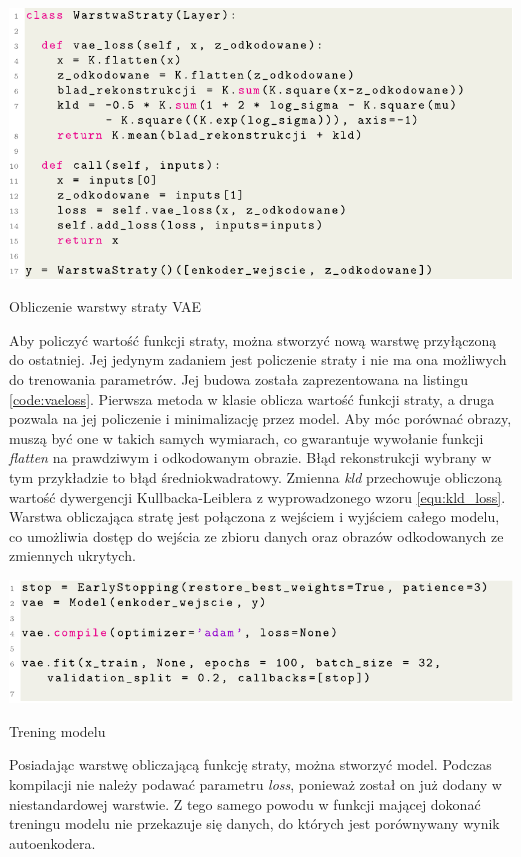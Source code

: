\documentclass[a4paper,12pt,oneside]{book} %
\begin{document}
\begin{code}[h!]
	\centering
	\includegraphics[width=\linewidth]{vaeloss.pdf}
	\caption{Obliczenie warstwy straty VAE}
	\label{code:vaeloss}
\end{code}

\newpage
Aby policzyć wartość funkcji straty, można stworzyć nową warstwę przyłączoną do ostatniej. Jej jedynym zadaniem jest policzenie straty i nie ma ona możliwych do trenowania parametrów. Jej budowa została zaprezentowana na listingu \ref{code:vaeloss}. Pierwsza metoda w klasie oblicza wartość funkcji straty, a druga pozwala na jej policzenie i minimalizację przez model. Aby móc porównać obrazy, muszą być one w takich samych wymiarach, co gwarantuje wywołanie funkcji \textit{flatten} na prawdziwym i odkodowanym obrazie. Błąd rekonstrukcji wybrany w tym przykładzie to błąd średniokwadratowy. Zmienna \textit{kld} przechowuje obliczoną wartość dywergencji Kullbacka-Leiblera z wyprowadzonego wzoru \ref{equ:kld_loss}. Warstwa obliczająca stratę jest połączona z wejściem i wyjściem całego modelu, co umożliwia dostęp do wejścia ze zbioru danych oraz obrazów odkodowanych ze zmiennych ukrytych. 

\begin{code}[h!]
	\centering
	\includegraphics[width=\linewidth]{vaetrain.pdf}
	\caption{Trening modelu}
\end{code}

Posiadając warstwę obliczającą funkcję straty, można stworzyć model. Podczas kompilacji nie należy podawać parametru \textit{loss}, ponieważ został on już dodany w niestandardowej warstwie. Z tego samego powodu w funkcji mającej dokonać treningu modelu nie przekazuje się danych, do których jest porównywany wynik autoenkodera.
\end{document}
